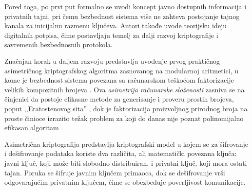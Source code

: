 Pored toga, po prvi put formalno se uvodi koncept javno dostupnih informacija i privatnih tajni, pri čemu bezbednost sistema više ne zahteva postojanje tajnog kanala za inicijalnu razmenu ključeva. Autori takođe uvode teorijsku ideju digitalnih potpisa, čime postavljaju temelj za dalji razvoj kriptografije i savremenih bezbednosnih protokola.

Značajan korak u daljem razvoju predstavlja uvođenje prvog praktičnog asimetričnog kriptografskog algoritma zasnovanog na modularnoj aritmetici, u kome je bezbednost sistema povezana sa računarskom teškoćom faktorizacije velikih kompozitnih brojeva \cite{rivest1978method}. Ova \textit{asimetrija računarske složenosti} \cite{wigderson2007p} zasniva se na činjenici da postoje efikasne metode za generisanje i proveru prostih brojeva, poput ,,Eratostenovog sita'' \cite{helfgott2020improved}, dok je faktorizacija proizvoljnog prirodnog broja na proste činioce izrazito težak problem za koji do danas nije poznat polinomijalno efikasan algoritam \cite{crandall2005prime}.

\begin{definicija}
Asimetrična kriptografija predstavlja kriptografski model u kojem se za šifrovanje i dešifrovanje podataka koriste dva različita, ali matematički povezana ključa: javni ključ, koji može biti slobodno distribuiran, i privatni ključ, koji mora ostati tajan. Poruka se šifruje javnim ključem primaoca, dok se dešifrovanje vrši odgovarajućim privatnim ključem, čime se obezbeđuje poverljivost komunikacije.
\end{definicija}

